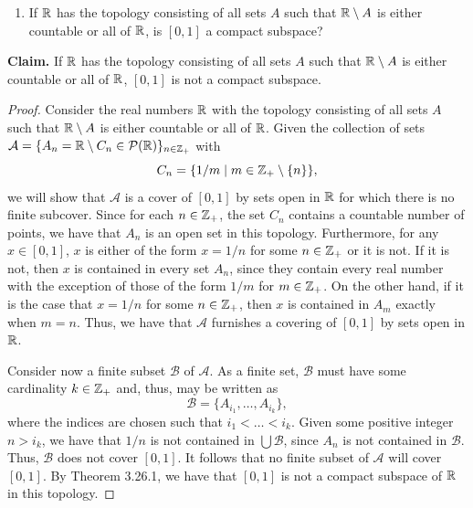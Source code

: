 \begin{solution}
  \begin{enumerate}[label={(\alph*)}, align=left, leftmargin=\parindent, listparindent=\parindent, labelwidth=0pt, itemindent=!]
    \addtocounter{enumi}{1}
    \item
          If $\mathbb{R}$ has the topology consisting of all sets $A$ such that $\mathbb{R} \setminus A$ is either countable or all of $\mathbb{R}$, is $[0, 1]$ a compact subspace?
  \end{enumerate}
  \noindent\textbf{Claim.} If $\mathbb{R}$ has the topology consisting of all sets $A$ such that $\mathbb{R} \setminus A$ is either countable or all of $\mathbb{R}$, $[0, 1]$ is not a compact subspace.
  \begin{proof}
    Consider the real numbers $\mathbb{R}$ with the topology consisting of all sets $A$ such that $\mathbb{R} \setminus A$ is either countable or all of $\mathbb{R}$.
    Given the collection of sets $\mathcal{A} = \{A_n = \mathbb{R} \setminus C_n \in \mathcal{P}(\mathbb{R}) \}_{n \in \mathbb{Z}_+}$ with
    \begin{equation*}
      C_n = \{1 / m \mid m \in \mathbb{Z}_+ \setminus \{n\}\},
    \end{equation*}
    we will show that $\mathcal{A}$ is a cover of $[0, 1]$ by sets open in $\mathbb{R}$ for which there is no finite subcover.
    Since for each $n \in \mathbb{Z}_+$, the set $C_n$ contains a countable number of points, we have that $A_n$ is an open set in this topology.
    Furthermore, for any $x \in [0, 1]$, $x$ is either of the form $x = 1 / n$ for some $n \in \mathbb{Z}_+$ or it is not.
    If it is not, then $x$ is contained in every set $A_n$, since they contain every real number with the exception of those of the form $1 / m$ for $m \in \mathbb{Z}_+$.
    On the other hand, if it is the case that $x = 1 / n$ for some $n \in \mathbb{Z}_+$, then $x$ is contained in $A_m$ exactly when $m = n$.
    Thus, we have that $\mathcal{A}$ furnishes a covering of $[0, 1]$ by sets open in $\mathbb{R}$.

    Consider now a finite subset $\mathcal{B}$ of $\mathcal{A}$.
    As a finite set, $\mathcal{B}$ must have some cardinality $k \in \mathbb{Z}_+$ and, thus, may be written as
    \begin{equation*}
      \mathcal{B} = \{A_{i_1}, \ldots, A_{i_k}\},
    \end{equation*}
    where the indices are chosen such that $i_1 < \ldots < i_k$.
    Given some positive integer $n > i_k$, we have that $1 / n$ is not contained in $\bigcup \mathcal{B}$, since $A_n$  is not contained in $\mathcal{B}$.
    Thus, $\mathcal{B}$ does not cover $[0, 1]$.
    It follows that no finite subset of $\mathcal{A}$ will cover $[0, 1]$.
    By Theorem 3.26.1, we have that $[0, 1]$ is not a compact subspace of $\mathbb{R}$ in this topology.
  \end{proof}
\end{solution}
\newpage

